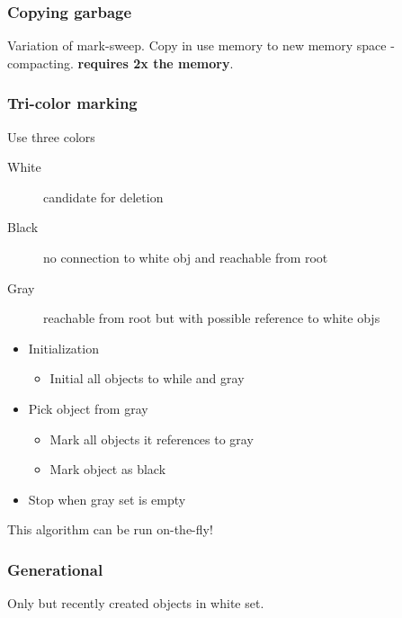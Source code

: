 \documentclass[a4paper]{article}
\begin{document}
\subsubsection{Copying garbage}
Variation of mark-sweep. Copy in use memory to new memory space - compacting.
\textbf{requires 2x the memory}.
\subsubsection{Tri-color marking}
Use three colors
\begin{description}
    \item[White] candidate for deletion
    \item[Black] no connection to white obj and reachable from root
    \item[Gray] reachable from root but with possible reference to white objs
\end{description}
\begin{itemize}
    \item Initialization
        \begin{itemize}
            \item Initial all objects to while and gray
        \end{itemize}
    \item Pick object from gray
        \begin{itemize}
            \item Mark all objects it references to gray
            \item Mark object as black
        \end{itemize}
    \item Stop when gray set is empty
\end{itemize}
This algorithm can be run on-the-fly!
\subsubsection{Generational}
Only but recently created objects in white set.
\end{document}
